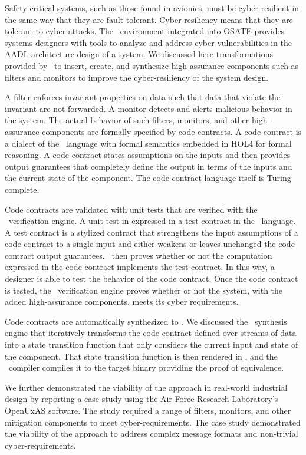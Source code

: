 Safety critical systems, such as those found in avionics, must be cyber-resilient in the same way that they are fault tolerant. 
Cyber-resiliency means that they are tolerant to cyber-attacks.
The \brfcs\ environment integrated into OSATE provides systems designers with tools to analyze and address cyber-vulnerabilities in the AADL architecture design of a system.
We discussed here transformations provided by \brfcs\ to insert, create, and synthesize high-assurance components such as filters and monitors to improve the cyber-resiliency of the system design.

A filter enforces invariant properties on data such that data that violate the invariant are not forwarded.
A monitor detects and alerts malicious behavior in the system. 
The actual behavior of such filters, monitors, and other high-assurance components are formally specified by code contracts.
A code contract is a dialect of the \agr\ language with formal semantics embedded in HOL4 for formal reasoning.
A code contract states assumptions on the inputs and then provides output guarantees that completely define the output in terms of the inputs and the current state of the component.
The code contract language itself is Turing complete.

Code contracts are validated with unit tests that are verified with the \agr\ verification engine.
A unit test in expressed in a test contract in the \agr\ language.
A test contract is a stylized contract that strengthens the input assumptions of a code contract to a single input and either weakens or leaves unchanged the code contract output guarantees.
\agr\ then proves whether or not the computation expressed in the code contract implements the test contract.
In this way, a designer is able to test the behavior of the code contract.
Once the code contract is tested, the \agr\ verification engine proves whether or not the system, with the added high-assurance components, meets its cyber requirements.

Code contracts are automatically synthesized to \ckml.
We discussed the \splt\ synthesis engine that iteratively transforms the code contract defined over streams of data into a state transition function that only considers the current input and state of the component.
That state transition function is then rendered in \ckml, and the \ckml\ compiler compiles it to the target binary providing the proof of equivalence.

We further demonstrated the viability of the approach in real-world industrial design by reporting a case study using the Air Force Research Laboratory's OpenUxAS software.
The study required a range of filters, monitors, and other mitigation components to meet cyber-requirements.
The case study demonstrated the viability of the approach to address complex message formats and non-trivial cyber-requirements.

